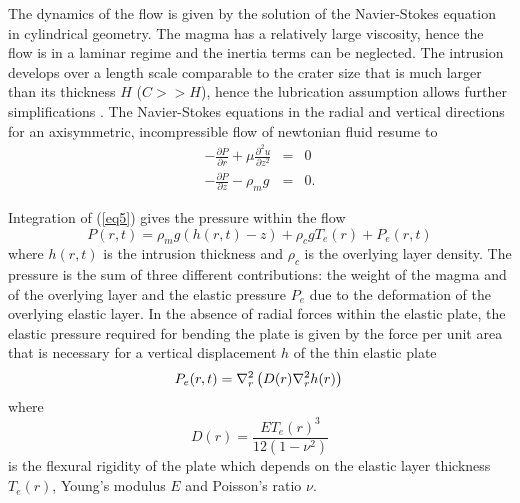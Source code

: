 \begin{article}
                  The dynamics of the flow is given by the solution of
                  the    Navier-Stokes    equation   in    cylindrical
                  geometry.   The  magma   has   a  relatively   large
                  viscosity, hence the flow is in a laminar regime and
                  the inertia  terms can  be neglected.  The intrusion
                  develops  over  a  length scale  comparable  to  the
                  crater size  that is much larger  than its thickness
                  $H$  ($C>>H$),  hence   the  lubrication  assumption
                  allows            further            simplifications
                  \citep{Huppert1982,Michaut2009}.  The  Navier-Stokes
                  equations in the radial  and vertical directions for
                  an  axisymmetric, incompressible  flow of  newtonian
                  fluid resume to
\begin{eqnarray}
  -\frac{\partial P}{\partial r} + \mu \frac{\partial^{2}u}{\partial z^{2}} &=&0\label{eq4} \\
  -\frac{\partial P}{\partial z} - \rho_{m}g& =&0.
                                                 \label{eq5}
\end{eqnarray}

Integration of (\ref{eq5}) gives the pressure within the flow
\begin{equation}
  P(r,t)=\rho_{m}g(h(r,t)-z) + \rho_{c}gT_e(r) + P_{e}(r,t)
  \label{eq6}
\end{equation}
where  $h(r,t)$  is  the  intrusion  thickness  and  $\rho_c$  is  the
overlying layer density.   The pressure is the sum  of three different
contributions: the weight of the magma  and of the overlying layer and
the elastic  pressure $P_e$  due to the  deformation of  the overlying
elastic  layer. In  the absence  of radial  forces within  the elastic
plate, the elastic pressure required for bending the plate is given by
the force per unit area that  is necessary for a vertical displacement
$h$ of the thin elastic plate \citep{Turcotte1981}
	\begin{equation}
          P_{e}(r,t)=\nabla^{2}_{r}\left( D(r)\nabla^{2}_{r}h(r) \right) \\	
          \label{eq8}	
	\end{equation}
	where
	\begin{equation}
          D(r)=\frac{ET_e(r)^{3}}{12(1-\nu^2)}
          \label{eq8a}
	\end{equation}
	is the  flexural rigidity  of the plate  which depends  on the
        elastic layer  thickness $T_{e}(r)$,  Young's modulus  $E$ and
        Poisson's ratio $\nu$.
	 	

\end{article}
